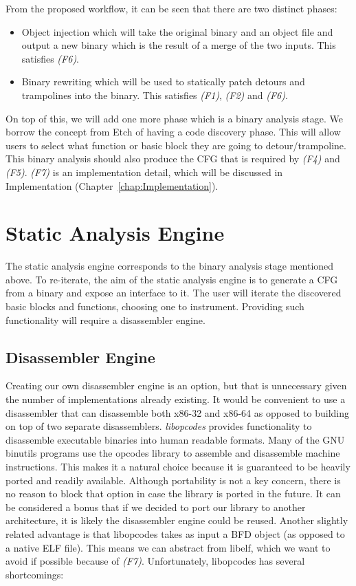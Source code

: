 From the proposed workflow, it can be seen that there are two distinct phases:

\begin{itemize}
\item Object injection which will take the original binary and an object file and output a new binary which is the result of a merge of the two inputs. This satisfies \emph{(F6)}.
\item Binary rewriting which will be used to statically patch detours and trampolines into the binary. This satisfies \emph{(F1)}, \emph{(F2)} and \emph{(F6)}.
\end{itemize}

On top of this, we will add one more phase which is a binary analysis stage. We borrow the concept from Etch of having a code discovery phase. This will allow users to select what function or basic block they are going to detour/trampoline. This binary analysis should also produce the CFG that is required by \emph{(F4)} and \emph{(F5)}. \emph{(F7)} is an implementation detail, which will be discussed in Implementation (Chapter~\ref{chap:Implementation}).

\section{Static Analysis Engine}

The static analysis engine corresponds to the binary analysis stage mentioned above. To re-iterate, the aim of the static analysis engine is to generate a CFG from a binary and expose an interface to it. The user will iterate the discovered basic blocks and functions, choosing one to instrument. Providing such functionality will require a disassembler engine.

\subsection{Disassembler Engine}

Creating our own disassembler engine is an option, but that is unnecessary given the number of implementations already existing. It would be convenient to use a disassembler that can disassemble both x86-32 and x86-64 as opposed to building on top of two separate disassemblers. \emph{libopcodes} provides functionality to disassemble executable binaries into human readable formats. Many of the GNU binutils programs use the opcodes library to assemble and disassemble machine instructions. This makes it a natural choice because it is guaranteed to be heavily ported and readily available. Although portability is not a key concern, there is no reason to block that option in case the library is ported in the future. It can be considered a bonus that if we decided to port our library to another architecture, it is likely the disassembler engine could be reused. Another slightly related advantage is that libopcodes takes as input a BFD object (as opposed to a native ELF file). This means we can abstract from libelf, which we want to avoid if possible because of \emph{(F7)}. Unfortunately, libopcodes has several shortcomings:

